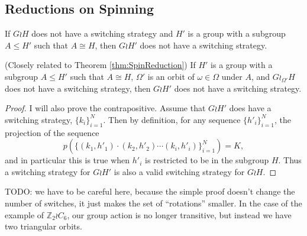 \subsection{Reductions on Spinning}
\begin{theorem}
  If $G \wr H$ does not have a switching strategy and $H'$ is a group with
  a subgroup $A \leq H'$ such that $A \cong H$, then
  $G \wr H'$ does not have a switching strategy.
  \label{thm:SpinReduction}
\end{theorem}
\begin{theorem}
  (Closely related to Theorem \ref{thm:SpinReduction})
  If
  $H'$ is a group with a subgroup $A \leq H'$ such that $A \cong H$,
  $\Omega'$ is an orbit of $\omega \in \Omega$ under $A$, and
  $G \wr_{\Omega'} H$ does not have a switching strategy, then
  $G \wr H'$ does not have a switching strategy.
  \label{thm:SpinReduction2}
\end{theorem}
\begin{proof}
  I will also prove the contrapositive. Assume that $G \wr H'$ does have
  a switching strategy, $\{k_i\}_{i=1}^N$. Then by definition, for any sequence
  $\{h'_i\}_{i=1}^N$, the projection of the sequence \[
    p(\{(k_1, h'_1)\cdot(k_2, h'_2)\cdots(k_i, h'_i)\}_{i=1}^N) = K,
  \] and in particular this is true when $h'_i$ is restricted to be in the
  subgroup $H$. Thus a switching strategy for $G \wr H'$ is also a valid
  switching strategy for $G \wr H$.
\end{proof}
TODO: we have to be careful here, because the simple proof doesn't change the
number of switches, it just makes the set of ``rotations'' smaller.
In the case of the example of $\mathbb Z_2 \wr C_6$, our group action is no
longer transitive, but instead we have two triangular orbits.

